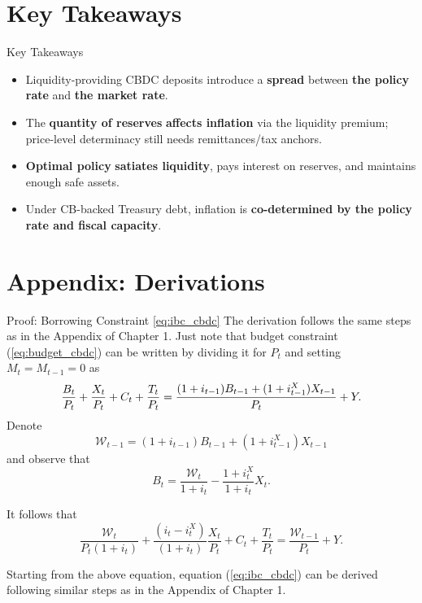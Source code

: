 \documentclass[11pt,aspectratio=169]{beamer}
\begin{document}
\section{Key Takeaways}

\begin{frame}{Key Takeaways}
\small
\begin{itemize}
  \item Liquidity-providing CBDC deposits introduce a \textbf{spread} between \textbf{the policy rate} and \textbf{the market rate}.

  \item The \textbf{quantity of reserves} \textbf{affects inflation} via the liquidity premium; price-level determinacy still needs remittances/tax anchors.

  \item \textbf{Optimal policy} \textbf{satiates liquidity}, pays interest on reserves, and maintains enough safe assets.

  \item Under CB-backed Treasury debt, inflation is \textbf{co-determined by the policy rate and fiscal capacity}.
\end{itemize}
\end{frame}
\appendix
\section{Appendix: Derivations}
\begin{frame}[label=borrowing_proof]{Proof: Borrowing Constraint \eqref{eq:ibc_cbdc}}
The derivation follows the same steps as in the Appendix of Chapter 1. Just
note that budget constraint (\ref{eq:budget_cbdc}) can be written by dividing it
for $P_{t}$ and setting $M_{t}=M_{t-1}=0$ as 
\begin{equation*}
\frac{B_{t}}{P_{t}}+\frac{X_{t}}{P_{t}}+C_{t}+\frac{T_{t}}{P_{t}}=\frac{%
(1+i_{t-1})B_{t-1}+(1+i_{t-1}^{X})X_{t-1}}{P_{t}}+Y.
\end{equation*}%
Denote%
\begin{equation*}
\mathcal{W}_{t-1}=(1+i_{t-1})B_{t-1}+(1+i_{t-1}^{X})X_{t-1}
\end{equation*}%
and observe that%
\begin{equation*}
B_{t}=\frac{\mathcal{W}_{t}}{1+i_{t}}-\frac{1+i_{t}^{X}}{1+i_{t}}X_{t}.
\end{equation*}%
\end{frame}
\begin{frame}
It follows that 
\begin{equation*}
\frac{\mathcal{W}_{t}}{P_{t}(1+i_{t})}+\frac{(i_{t}-i_{t}^{X})}{(1+i_{t})}%
\frac{X_{t}}{P_{t}}+C_{t}+\frac{T_{t}}{P_{t}}=\frac{\mathcal{W}_{t-1}}{P_{t}}%
+Y.
\end{equation*}

Starting from the above equation, equation (\ref{eq:ibc_cbdc}) can be derived
following similar steps as in the Appendix of Chapter 1.    
\begin{center}
\hyperlink{borrowing}{}
\end{center}
\end{frame}
\end{document}
